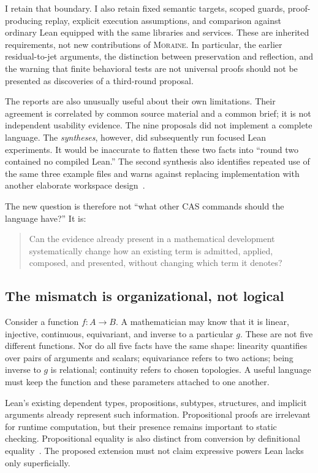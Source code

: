 \documentclass[11pt,letterpaper]{article}
\newcommand{\moraine}{\textsc{Moraine}}
\theoremstyle{definition}
\theoremstyle{remark}
\begin{document}
I retain that boundary. I also retain fixed semantic targets, scoped guards,
proof-producing replay, explicit execution assumptions, and comparison against
ordinary Lean equipped with the same libraries and services. These are inherited
requirements, not new contributions of \moraine. In particular, the earlier
residual-to-jet arguments, the distinction between preservation and reflection,
and the warning that finite behavioral tests are not universal proofs should not
be presented as discoveries of a third-round proposal.

The reports are also unusually useful about their own limitations. Their
agreement is correlated by common source material and a common brief; it is not
independent usability evidence. The nine proposals did not implement a complete
language. The \emph{syntheses}, however, did subsequently run focused Lean
experiments. It would be inaccurate to flatten these two facts into ``round two
contained no compiled Lean.'' The second synthesis also identifies repeated use
of the same three example files and warns against replacing implementation with
another elaborate workspace design~\cite{B1,B2}.

The new question is therefore not ``what other CAS commands should the language
have?'' It is:
\begin{quote}
Can the evidence already present in a mathematical development systematically
change how an existing term is admitted, applied, composed, and presented,
without changing which term it denotes?
\end{quote}

\subsection{The mismatch is organizational, not logical}
Consider a function $f:A\to B$. A mathematician may know that it is linear,
injective, continuous, equivariant, and inverse to a particular $g$. These are
not five different functions. Nor do all five facts have the same shape:
linearity quantifies over pairs of arguments and scalars; equivariance refers to
two actions; being inverse to $g$ is relational; continuity refers to chosen
topologies. A useful language must keep the function and these parameters
attached to one another.

Lean's existing dependent types, propositions, subtypes, structures, and implicit
arguments already represent such information. Propositional proofs are
irrelevant for runtime computation, but their presence remains important to
static checking. Propositional equality is also distinct from conversion by
definitional equality~\cite{LeanTypes,LeanProps,LeanEq}. The proposed extension
must not claim expressive powers Lean lacks only superficially.
\end{document}
